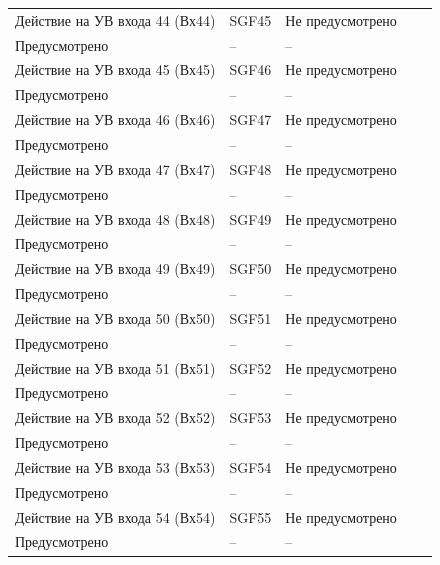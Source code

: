 \begin{longtable}{|>{\centering\arraybackslash}m{5.3cm}|>{\centering\arraybackslash}m{3.3cm}|>{\centering\arraybackslash}m{4.2cm}|>{\centering\arraybackslash}m{1.8cm}|>{\centering\arraybackslash}m{1cm}|}
\hline
\centering Действие на УВ входа 44 (Вх44)  & \centering SGF45 & \centering Не предусмотрено \\ Предусмотрено & \centering -- & \centering \arraybackslash -- \\
\hline
\centering Действие на УВ входа 45 (Вх45)  & \centering SGF46 & \centering Не предусмотрено \\ Предусмотрено & \centering -- & \centering \arraybackslash -- \\
\hline
\centering Действие на УВ входа 46 (Вх46)  & \centering SGF47 & \centering Не предусмотрено \\ Предусмотрено & \centering -- & \centering \arraybackslash -- \\
\hline
\centering Действие на УВ входа 47 (Вх47)  & \centering SGF48 & \centering Не предусмотрено \\ Предусмотрено & \centering -- & \centering \arraybackslash -- \\
\hline
\centering Действие на УВ входа 48 (Вх48)  & \centering SGF49 & \centering Не предусмотрено \\ Предусмотрено & \centering -- & \centering \arraybackslash -- \\
\hline
\centering Действие на УВ входа 49 (Вх49)  & \centering SGF50 & \centering Не предусмотрено \\ Предусмотрено & \centering -- & \centering \arraybackslash -- \\
\hline
\centering Действие на УВ входа 50 (Вх50)  & \centering SGF51 & \centering Не предусмотрено \\ Предусмотрено & \centering -- & \centering \arraybackslash -- \\
\hline
\centering Действие на УВ входа 51 (Вх51)  & \centering SGF52 & \centering Не предусмотрено \\ Предусмотрено & \centering -- & \centering \arraybackslash -- \\
\hline
\centering Действие на УВ входа 52 (Вх52)  & \centering SGF53 & \centering Не предусмотрено \\ Предусмотрено & \centering -- & \centering \arraybackslash -- \\
\hline
\centering Действие на УВ входа 53 (Вх53)  & \centering SGF54 & \centering Не предусмотрено \\ Предусмотрено & \centering -- & \centering \arraybackslash -- \\
\hline
\centering Действие на УВ входа 54 (Вх54)  & \centering SGF55 & \centering Не предусмотрено \\ Предусмотрено & \centering -- & \centering \arraybackslash -- \\

\end{longtable}

